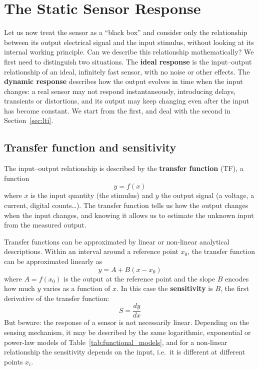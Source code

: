 \documentclass[letterpaper,11pt,leqno]{book}
\begin{document}
\section{The Static Sensor Response}
\label{sec:static_response}

Let us now treat the sensor as a ``black box'' and consider only the relationship between its output electrical signal and the input stimulus, without looking at its internal working principle. Can we describe this relationship mathematically? We first need to distinguish two situations. The \textbf{ideal response} is the input--output relationship of an ideal, infinitely fast sensor, with no noise or other effects. The \textbf{dynamic response} describes how the output evolves in time when the input changes: a real sensor may not respond instantaneously, introducing delays, transients or distortions, and its output may keep changing even after the input has become constant. We start from the first, and deal with the second in Section~\ref{sec:lti}.

\subsection{Transfer function and sensitivity}

The input--output relationship is described by the \textbf{transfer function} (TF), a function
\begin{equation}
\boxed{y = f(x)}
\label{eq:static_transfer_function}
\end{equation}
where $x$ is the input quantity (the stimulus) and $y$ the output signal (a voltage, a current, digital counts\dots). The transfer function tells us how the output changes when the input changes, and knowing it allows us to estimate the unknown input from the measured output.

Transfer functions can be approximated by linear or non-linear analytical descriptions. Within an interval around a reference point $x_0$, the transfer function can be approximated linearly as
\begin{equation}
\boxed{y = A + B(x - x_0)}
\label{eq:taylor_linearization}
\end{equation}
where $A = f(x_0)$ is the output at the reference point and the slope $B$ encodes how much $y$ varies as a function of $x$. In this case the \textbf{sensitivity} is $B$, the first derivative of the transfer function:
\begin{equation}
\boxed{S = \frac{dy}{dx}}
\label{eq:sensitivity_definition}
\end{equation}
But beware: the response of a sensor is not necessarily linear. Depending on the sensing mechanism, it may be described by the same logarithmic, exponential or power-law models of Table~\ref{tab:functional_models}, and for a non-linear relationship the sensitivity depends on the input, i.e.\ it is different at different points $x_i$.
\end{document}
